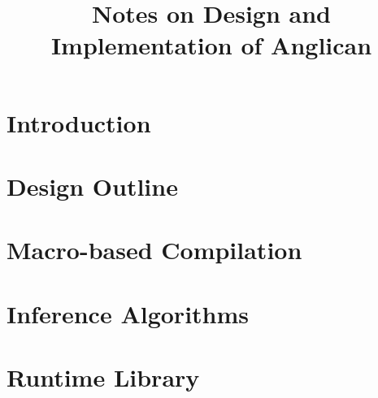 \documentclass[a4paper]{article}
\title{Notes on Design and Implementation of Anglican}
\begin{document}
\maketitle

\begin{abstract}
\end{abstract}

\section{Introduction}

\section{Design Outline}

\section{Macro-based Compilation}

\section{Inference Algorithms}

\section{Runtime Library}




\end{document}
